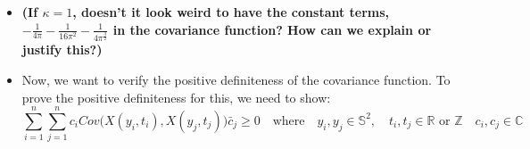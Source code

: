 \documentclass[11pt]{article}
\begin{document}
\begin{itemize}
{\begin{align*}
& + \sum_{\ell_1=0}^{\kappa-1} \sum_{m_1=-\ell_1}^{\ell_1} (\delta \delta_{\ell_1, m_1}) Y_{\ell_1}^{m_1}(Q) \biggl\{\frac{(1 - {(\gamma \gamma_{\ell_1,m_1})}^2 e^{-2 \beta \lvert h \lvert})}{(1-2 \cos{(\overrightarrow{P \tau_{\ell_1,m_1}})} (\gamma \gamma_{\ell_1,m_1} e^{-\beta \lvert h \lvert}) + {(\gamma \gamma_{\ell_1,m_1})}^2 e^{-2 \beta \lvert h \lvert})^{3/2}} - \sum_{\ell_2=0}^{\kappa-1} \frac{2\ell_2+1}{4\pi} a_{\ell_2}^{(\ell_1,m_1)}(h)  P_{\ell_2}(\cos{\overrightarrow{P\tau_{\ell_1,m_1}}}) \biggl\}\\
\\
&\quad \text{where } \delta, \delta_{\ell_1,m_1}>0, \quad 0<\gamma, \gamma_{\ell_1,m_1}, \gamma_{\ell_1',m_1'} < 1, \quad \beta >0, \quad \tau_{\ell_1,m_1},  \tau_{\ell_1',m_1'} \in \mathbb{S}^2 \\
\end{align*}
}

\item
\textbf{{\color{red} (If $\kappa=1$, doesn't it look weird to have the constant terms, $-\frac{1}{4\pi} - \frac{1}{16\pi^2} - \frac{1}{4\pi^\frac{3}{2}}$ in the covariance function? How can we explain or justify this?)}}\\

\item
Now, we want to verify the positive definiteness of the covariance function. To prove the positive definiteness for this, we need to show:\\
$$\sum_{i=1}^n \sum_{j=1}^n c_i Cov\biggl(X(y_i,t_i), X(y_j,t_j)\biggl) \bar{c}_j  \ge 0 \quad \text{where} \quad y_i,y_j \in \mathbb{S}^2, \quad t_i,t_j \in \mathbb{R} \text{ or } \mathbb{Z} \quad c_i, c_j \in \mathbb{C}$$


\end{itemize}
\end{document}
